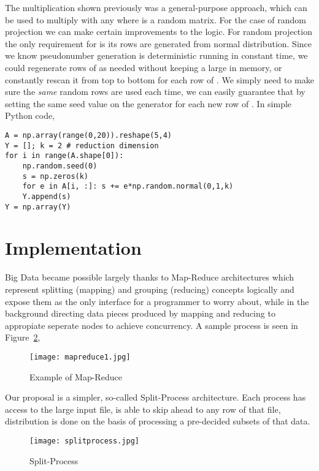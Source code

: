 \documentclass{article}
\begin{document}
The multiplication shown previously was a general-purpose approach, which can be
used to multiply  with any  where  is a random matrix. For the case of
random projection we can make certain improvements to the logic. For random
projection the only requirement for  is its rows are generated from normal
 distribution. Since we know pseudonumber generation is deterministic
running in constant time, we could regenerate rows of  as needed without
keeping a large  in memory, or constantly rescan it from top to bottom for
each row of . We simply need to make sure the {\em same} random  rows are
used each time, we can easily guarantee that by setting the same seed value on
the generator for each new row of . In simple Python code,

\begin{verbatim}
A = np.array(range(0,20)).reshape(5,4)
Y = []; k = 2 # reduction dimension
for i in range(A.shape[0]):
    np.random.seed(0)
    s = np.zeros(k)
    for e in A[i, :]: s += e*np.random.normal(0,1,k)
    Y.append(s)
Y = np.array(Y)
\end{verbatim}

\section{Implementation}

Big Data became possible largely thanks to Map-Reduce architectures which
represent splitting (mapping) and grouping (reducing) concepts logically and
expose them as the only interface for a programmer to worry about, while in the
background directing data pieces produced by mapping and reducing to appropiate
seperate nodes to achieve concurrency. A sample process is seen in
Figure~\ref{fig:mapreduce1},

\begin{figure}[h]
  \centering
  \texttt{[image: mapreduce1.jpg]}
  \caption{Example of Map-Reduce}
  \label{fig:mapreduce1}
\end{figure}

Our proposal is a simpler, so-called Split-Process architecture. Each process
has access to the large input file, is able to skip ahead to any row of that
file, distribution is done on the basis of processing a pre-decided subsets of
that data.

\begin{figure}[h]
  \centering
  \texttt{[image: splitprocess.jpg]}
  \caption{Split-Process}
  \label{fig:mapreduce1}
\end{figure}
\end{document}
